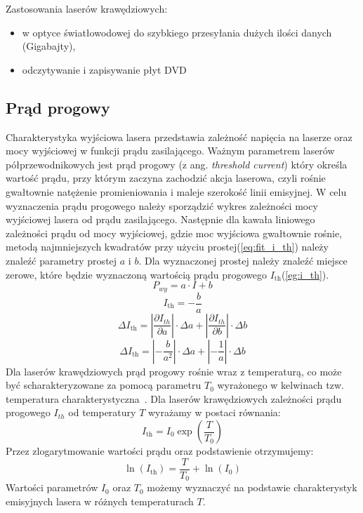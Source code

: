Zastosowania laserów krawędziowych:
\begin{itemize}
\item w optyce światłowodowej do szybkiego przesyłania dużych ilości danych (Gigabajty),
\item odczytywanie i zapisywanie płyt DVD
\end{itemize}
\newpage
\subsection{Prąd progowy}
Charakterystyka wyjściowa lasera przedstawia zależność napięcia na laserze oraz mocy wyjściowej w funkcji prądu zasilającego.
Ważnym parametrem laserów półprzewodnikowych jest prąd progowy (z ang. \textit{threshold
current}) który określa wartość prądu, przy którym zaczyna zachodzić akcja laserowa, czyli
rośnie gwałtownie natężenie promieniowania i maleje szerokość linii emisyjnej. W celu wyznaczenia prądu progowego należy
sporządzić wykres zależności mocy wyjściowej lasera od prądu zasilającego. Następnie dla kawała liniowego zależności prądu
od mocy wyjściowej, gdzie moc wyjściowa gwałtownie rośnie, metodą najmniejszych kwadratów przy użyciu prostej(\ref{eq:fit_i_th}) należy
znaleźć parametry prostej $a$ i $b$.
Dla wyznaczonej prostej należy znaleźć miejsce zerowe, które będzie wyznaczoną wartością prądu progowego $I_{\mathrm{th}}$(\ref{eg:i_th}).
\begin{equation}
\label{eq:fit_i_th}
P_{wy} = a \cdot I + b
\end{equation}
\begin{equation}
\label{eg:i_th}
I_{\mathrm{th}} = -\frac{b}{a}
\end{equation}
\begin{equation}
\Delta I_{\mathrm{th}} = \left\lvert \frac{\partial I_{th}}{\partial a} \right\rvert \cdot \Delta a + \left\lvert \frac{\partial I_{th}}{\partial b} \right\rvert \cdot \Delta b
\end{equation}
\begin{equation}
\Delta I_{\mathrm{th}} = \left\lvert -\frac{b}{a^2} \right\rvert \cdot \Delta a + \left\lvert -\frac{1}{a} \right\rvert \cdot \Delta b
\end{equation}
Dla laserów krawędziowych prąd progowy rośnie wraz z temperaturą, co może być scharakteryzowane za pomocą parametru
$T_{0}$ wyrażonego w kelwinach tzw. temperatura charakterystyczna~\cite{opto_book}.
Dla laserów krawędziowych zależności prądu progowego $I_{th}$ od temperatury $T$ wyrażamy w postaci równania:
\begin{equation}
\label{eq:i_th}
I_{\mathrm{th}} = I_0 \exp \left( \frac{T}{T_0} \right)
\end{equation}
Przez zlogarytmowanie wartości prądu oraz podstawienie otrzymujemy:
\begin{equation}
\ln(I_{\mathrm{th}}) = \frac{T}{T_0} + \ln(I_0)
\end{equation}
Wartości parametrów $I_0$ oraz $T_0$ możemy wyznaczyć na podstawie charakterystyk
emisyjnych lasera w różnych temperaturach $T$.

